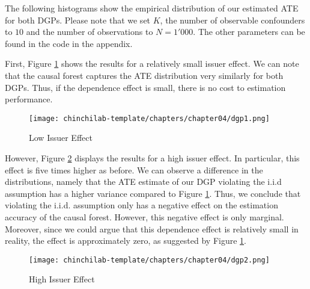 The following histograms show the empirical distribution of our estimated ATE for both DGPs. Please note that we set $K$, the number of observable confounders to $10$ and the number of
observations to $N = 1'000$. The other parameters can be found in the code in the appendix.

First, Figure \ref{LIE} shows the results for a relatively small issuer effect. We can note that the causal forest captures the ATE distribution very similarly for both DGPs. Thus, if the dependence effect is small, there is no cost to estimation performance.

\begin{figure}[H]
    \centering
    \texttt{[image: chinchilab-template/chapters/chapter04/dgp1.png]}
    \caption{Low Issuer Effect}
    \label{LIE}
\end{figure}

However, Figure \ref{HIE} displays the results for a high issuer effect. In particular, this effect is five times higher as before. We can observe a difference in the distributions, namely that the ATE estimate of our DGP violating the i.i.d assumption has a higher variance compared to Figure \ref{LIE}. Thus, we conclude that violating the i.i.d. assumption only has a negative effect on the estimation accuracy of the causal forest. However, this negative effect is only marginal. Moreover, since we could argue that this dependence effect is relatively small in reality, the effect is approximately zero, as suggested by Figure \ref{LIE}.

\begin{figure}[H]
    \centering
    \texttt{[image: chinchilab-template/chapters/chapter04/dgp2.png]}
    \caption{High Issuer Effect}
    \label{HIE}
\end{figure}